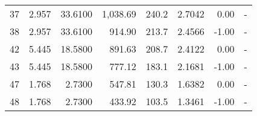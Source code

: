 \documentclass[]{article}
\begin{document}
\begin{longtable}[H]{lrrrrrrr}
37    &                                                     2.957 &                                            33.6100 &                   1,038.69 &                                                      240.2 &                      2.7042 &                                                        0.00 &                                                                                           - \\
38    &                                                     2.957 &                                            33.6100 &                     914.90 &                                                      213.7 &                      2.4566 &                                                       -1.00 &                                                                                           - \\
42    &                                                     5.445 &                                            18.5800 &                     891.63 &                                                      208.7 &                      2.4122 &                                                        0.00 &                                                                                           - \\
43    &                                                     5.445 &                                            18.5800 &                     777.12 &                                                      183.1 &                      2.1681 &                                                       -1.00 &                                                                                           - \\
47    &                                                     1.768 &                                             2.7300 &                     547.81 &                                                      130.3 &                      1.6382 &                                                        0.00 &                                                                                           - \\
48    &                                                     1.768 &                                             2.7300 &                     433.92 &                                                      103.5 &                      1.3461 &                                                       -1.00 &                                                                                           - \\

\end{longtable}
\end{document}
